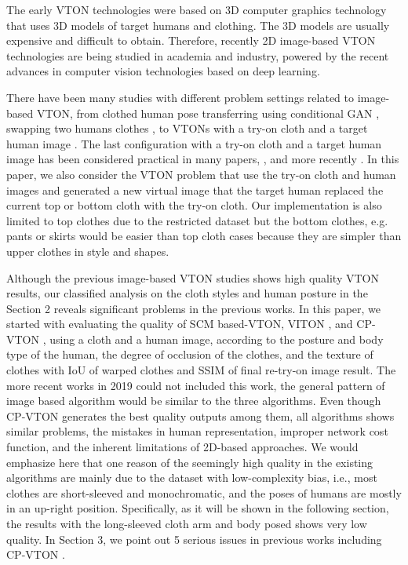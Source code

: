 \documentclass[runningheads]{llncs}
\begin{document}
The early VTON technologies were based on 3D computer graphics technology that uses 3D models of target humans and clothing. The 3D models are usually expensive and difficult to obtain. Therefore, recently 2D image-based VTON technologies are being studied in academia and industry, powered by the recent advances in computer vision technologies based on deep learning. 

There have been many studies with different problem settings related to image-based VTON, from clothed human pose transferring using conditional GAN \cite{ma2017pose}, swapping two humans clothes \cite{jetchev2017conditional}, to VTONs with a try-on cloth and a target human image \cite{Han2017VITONAI}. The last configuration with a try-on cloth and a target human image has been considered practical in many papers, \cite{Han2017VITONAI,Wang2018TowardCI}, and more recently \cite{Sun2019ImageBasedVT,Yu_2019_ICCV,jae2019viton}. 
In this paper, we also consider the VTON problem that use the try-on cloth and human images and generated a new virtual image that the target human replaced the current top or bottom cloth with the try-on cloth. Our implementation is also limited to top clothes due to the restricted dataset but the bottom clothes, e.g. pants or skirts would be easier than top cloth cases because they are simpler than upper clothes in style and shapes.

Although the previous image-based VTON studies shows high quality VTON results, our classified analysis on the cloth styles and human posture in the Section 2 reveals significant problems in the previous works. In this paper, we started with evaluating the quality of SCM\cite{BelongieMP02} based-VTON, VITON \cite{Han2017VITONAI}, and CP-VTON \cite{Wang2018TowardCI}, using a cloth and a human image, according to the posture and body type of the human, the degree of occlusion of the clothes, and the texture of clothes with IoU of warped clothes and SSIM of final re-try-on image result. The more recent works in 2019 could not included this work, the general pattern of image based algorithm would be similar to the three algorithms. Even though CP-VTON generates the best quality outputs among them, all algorithms shows similar problems, the mistakes in human representation, improper network cost function, and the inherent limitations of 2D-based approaches.   
%
We would emphasize here that one reason of the seemingly high quality in the existing algorithms are mainly due to the dataset with low-complexity bias, i.e., most clothes are short-sleeved  and monochromatic, and the poses of humans are mostly in an up-right position. Specifically, as it will be shown in the following section, the results with the long-sleeved cloth arm and body posed shows very low quality. In Section 3, we point out 5 serious issues in previous works including CP-VTON \cite{Wang2018TowardCI}.  
\end{document}
